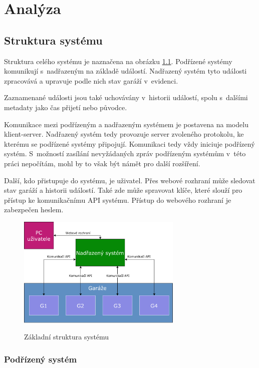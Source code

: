 \chapter{Analýza}
\label{sec:an}

\section{Struktura systému}

Struktura celého systému je naznačena na obrázku \ref{fig:basic_struct}. Podřízené systémy komunikují s~nadřazeným na základě událostí. Nadřazený systém tyto události zpracovává a upravuje podle nich stav garáží v~evidenci. 

Zaznamenané události jsou také uchovávány v~historii událostí, spolu s~dalšími metadaty jako čas přijetí nebo původce.

Komunikace mezi podřízeným a nadřazeným systémem je postavena na modelu klient-server. Nadřazený systém tedy provozuje server zvoleného protokolu, ke kterému se podřízené systémy připojují. Komunikaci tedy vždy iniciuje podřízený systém. S~možností zasílání nevyžádaných zpráv podřízeným systémům v~této práci nepočítám, mohl by to však být námět pro další rozšíření.

Další, kdo přistupuje do systému, je uživatel. Přes webové rozhraní může sledovat stav garáží a historii událostí. Také zde může spravovat klíče, které slouží pro přístup ke komunikačnímu API systému. Přístup do webového rozhraní je zabezpečen heslem. 

\begin{figure}[h!]
    \centering
    \includegraphics[width=0.7\textwidth]{images/basic_struct.pdf}
    \label{fig:basic_struct}
    \caption{Základní struktura systému}
\end{figure}

\subsection{Podřízený systém}

